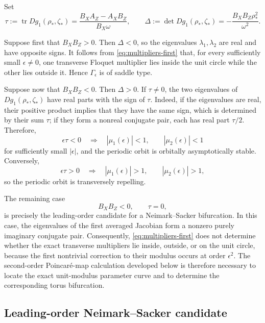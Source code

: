 \documentclass[11pt]{amsart}
\theoremstyle{remark}
\newcommand{\tr}{\operatorname{tr}}
\begin{document}
Set
\begin{equation}
\label{eq:tau-delta}
 \tau
 :=
 \tr Dg_1(\rho_*,\zeta_*)
 =
 \frac{B_XA_Z-A_XB_Z}{B_X\omega},
 \qquad
 \Delta
 :=
 \det Dg_1(\rho_*,\zeta_*)
 =
 -\frac{B_XB_Z\rho_*^2}{\omega^2}.
\end{equation}

Suppose first that $B_XB_Z>0$. Then $\Delta<0$, so the eigenvalues
$\lambda_1,\lambda_2$ are real and have opposite signs. It follows from
\eqref{eq:multipliers-first} that, for every sufficiently small
$\epsilon\ne0$, one transverse Floquet multiplier lies inside the unit
circle while the other lies outside it. Hence $\Gamma_\epsilon$ is of
saddle type.

Suppose now that $B_XB_Z<0$. Then $\Delta>0$. If $\tau\ne0$, the two
eigenvalues of $Dg_1(\rho_*,\zeta_*)$ have real parts with the sign of
$\tau$. Indeed, if the eigenvalues are real, their positive product
implies that they have the same sign, which is determined by their sum
$\tau$; if they form a nonreal conjugate pair, each has real part
$\tau/2$. Therefore,
\[
 \epsilon\tau<0
 \quad\Longrightarrow\quad
 |\mu_1(\epsilon)|<1,\qquad
 |\mu_2(\epsilon)|<1
\]
for sufficiently small $|\epsilon|$, and the periodic orbit is orbitally
asymptotically stable. Conversely,
\[
 \epsilon\tau>0
 \quad\Longrightarrow\quad
 |\mu_1(\epsilon)|>1,\qquad
 |\mu_2(\epsilon)|>1,
\]
so the periodic orbit is transversely repelling.

The remaining case
\[
 B_XB_Z<0,
 \qquad
 \tau=0,
\]
is precisely the leading-order candidate for a Neimark--Sacker
bifurcation. In this case, the eigenvalues of the first averaged Jacobian
form a nonzero purely imaginary conjugate pair. Consequently,
\eqref{eq:multipliers-first} does not determine whether the exact
transverse multipliers lie inside, outside, or on the unit circle,
because the first nontrivial correction to their modulus occurs at order
$\epsilon^2$. The second-order Poincar\'e-map calculation developed below
is therefore necessary to locate the exact unit-modulus parameter curve
and to determine the corresponding torus bifurcation. 

\subsection{Leading-order Neimark--Sacker candidate}
\end{document}
